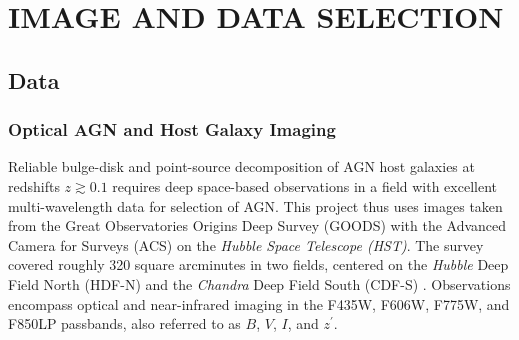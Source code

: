 \documentclass[11pt,twocolumn]{article}
\begin{document}

\section{\normalsize IMAGE AND DATA SELECTION}\label{data}
\subsection{\normalsize Data}
\subsubsection{\normalsize Optical AGN and Host Galaxy Imaging}
Reliable bulge-disk and point-source decomposition of AGN host galaxies at redshifts $z \gtrsim 0.1$ requires deep space-based observations in a field with excellent multi-wavelength data for selection of AGN. This project thus uses images taken from the Great Observatories Origins Deep Survey (GOODS) \cite{2003mglh.conf..324D} with the Advanced Camera for Surveys (ACS) on the \emph{Hubble Space Telescope (HST)}. The survey covered roughly 320 square arcminutes in two fields, centered on the \emph{Hubble} Deep Field North (HDF-N) and the \emph{Chandra} Deep Field South (CDF-S) \cite{2004ApJ...600L..93G}. Observations encompass optical and near-infrared imaging in the F435W, F606W, F775W, and F850LP passbands, also referred to as $B$, $V$, $I$, and $z^\prime$. 
\end{document}
